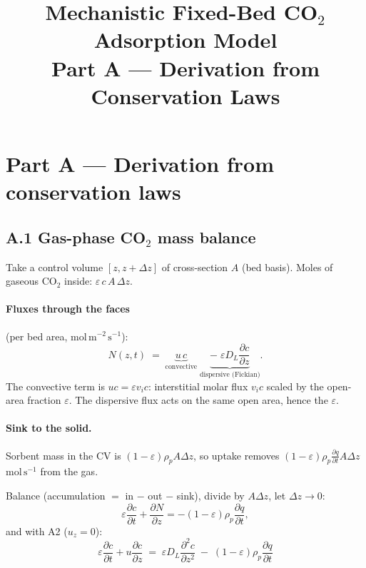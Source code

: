 \documentclass[11pt]{article}
\title{Mechanistic Fixed-Bed CO$_2$ Adsorption Model\\[2pt]
\large Part A --- Derivation from Conservation Laws}
\author{}
\date{}
\theoremstyle{remark}
\begin{document}
\maketitle

\section*{Part A --- Derivation from conservation laws}

\subsection*{A.1 Gas-phase CO$_2$ mass balance}

Take a control volume $[z,z+\Delta z]$ of cross-section $A$ (bed basis). Moles of
gaseous CO$_2$ inside: $\varepsilon\,c\,A\,\Delta z$.

\paragraph{Fluxes through the faces} (per bed area, $\mathrm{mol\,m^{-2}\,s^{-1}}$):
\begin{equation*}
N(z,t) \;=\; \underbrace{u\,c}_{\text{convective}}\;
\underbrace{-\;\varepsilon D_L \frac{\partial c}{\partial z}}_{\text{dispersive (Fickian)}}.
\end{equation*}
The convective term is $u c = \varepsilon v_i c$: interstitial molar flux $v_i c$
scaled by the open-area fraction $\varepsilon$. The dispersive flux acts on the same
open area, hence the $\varepsilon$.

\paragraph{Sink to the solid.} Sorbent mass in the CV is $(1-\varepsilon)\rho_p A\Delta z$,
so uptake removes $(1-\varepsilon)\rho_p \frac{\partial q}{\partial t} A\Delta z$
$\mathrm{mol\,s^{-1}}$ from the gas.

Balance (accumulation $=$ in $-$ out $-$ sink), divide by $A\Delta z$, let $\Delta z\to0$:
\begin{equation*}
\varepsilon\frac{\partial c}{\partial t} + \frac{\partial N}{\partial z}
= -(1-\varepsilon)\rho_p\frac{\partial q}{\partial t},
\end{equation*}
and with A2 ($u_z=0$):
\begin{equation}
\boxed{\;\varepsilon\frac{\partial c}{\partial t} + u\frac{\partial c}{\partial z}
\;=\; \varepsilon D_L\frac{\partial^2 c}{\partial z^2}
\;-\;(1-\varepsilon)\rho_p\frac{\partial q}{\partial t}\;}
\tag{A.1}\label{eq:A1}
\end{equation}
\end{document}
